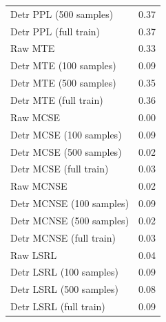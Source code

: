 \begin{table}
\begin{tabular}{lc}
Detr PPL (500 samples) & 0.37 \\
Detr PPL (full train) & 0.37 \\
\midrule
Raw MTE & 0.33 \\
Detr MTE (100 samples) & 0.09 \\
Detr MTE (500 samples) & 0.35 \\
Detr MTE (full train) & 0.36 \\
\midrule
Raw MCSE & 0.00 \\
Detr MCSE (100 samples) & 0.09 \\
Detr MCSE (500 samples) & 0.02 \\
Detr MCSE (full train) & 0.03 \\
\midrule
Raw MCNSE & 0.02 \\
Detr MCNSE (100 samples) & 0.09 \\
Detr MCNSE (500 samples) & 0.02 \\
Detr MCNSE (full train) & 0.03 \\
\midrule
Raw LSRL & 0.04 \\
Detr LSRL (100 samples) & 0.09 \\
Detr LSRL (500 samples) & 0.08 \\
Detr LSRL (full train) & 0.09 \\
\midrule
\midrule
\end{tabular}
\end{table}
